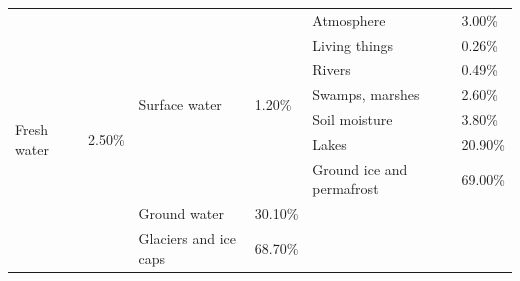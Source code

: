 \documentclass{article}
\begin{document}
\begin{table}[ht]
\begin{center}
\begin{tabular}{|l|l|llll}
\hline
\multirow{9}{*}{Fresh water} & \multirow{9}{*}{2.50\%} & \multicolumn{1}{l|}{\multirow{7}{*}{Surface water}} & \multicolumn{1}{l|}{\multirow{7}{*}{1.20\%}} & \multicolumn{1}{l|}{Atmosphere}                & \multicolumn{1}{l|}{3.00\%}  \\ \cline{5-6} 
                             &                         & \multicolumn{1}{l|}{}                               & \multicolumn{1}{l|}{}                        & \multicolumn{1}{l|}{Living things}             & \multicolumn{1}{l|}{0.26\%}  \\ \cline{5-6} 
                             &                         & \multicolumn{1}{l|}{}                               & \multicolumn{1}{l|}{}                        & \multicolumn{1}{l|}{Rivers}                    & \multicolumn{1}{l|}{0.49\%}  \\ \cline{5-6} 
                             &                         & \multicolumn{1}{l|}{}                               & \multicolumn{1}{l|}{}                        & \multicolumn{1}{l|}{Swamps, marshes}           & \multicolumn{1}{l|}{2.60\%}  \\ \cline{5-6} 
                             &                         & \multicolumn{1}{l|}{}                               & \multicolumn{1}{l|}{}                        & \multicolumn{1}{l|}{Soil moisture}             & \multicolumn{1}{l|}{3.80\%}  \\ \cline{5-6} 
                             &                         & \multicolumn{1}{l|}{}                               & \multicolumn{1}{l|}{}                        & \multicolumn{1}{l|}{Lakes}                     & \multicolumn{1}{l|}{20.90\%} \\ \cline{5-6} 
                             &                         & \multicolumn{1}{l|}{}                               & \multicolumn{1}{l|}{}                        & \multicolumn{1}{l|}{Ground ice and permafrost} & \multicolumn{1}{l|}{69.00\%} \\ \cline{3-6} 
                             &                         & \multicolumn{1}{l|}{Ground water}                   & \multicolumn{1}{l|}{30.10\%}                 &                                                &                              \\ \cline{3-4}
                             &                         & \multicolumn{1}{l|}{Glaciers and ice caps}          & \multicolumn{1}{l|}{68.70\%}                 &                                                &                              \\ \cline{1-4}

\end{tabular}
\end{center}
\end{table}
\end{document}
